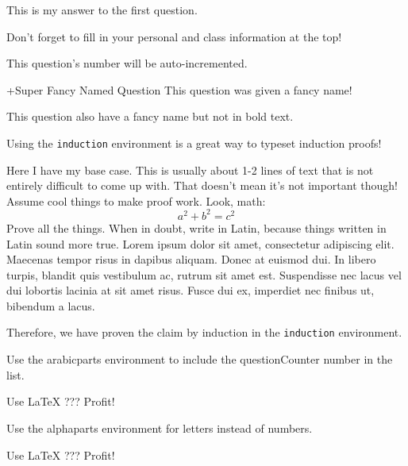 \documentclass[11pt]{homework}
\begin{document}
\maketitle

\question
This is my answer to the first question.

Don't forget to fill in your personal and class information at the top!

\question
This question's number will be auto-incremented.

\lipsum[2]

\question+{Super Fancy Named Question}
This question was given a fancy name!

This question also have a fancy name but not in bold text.

\lipsum[3]

\newpage
\question
Using the \texttt{induction} environment is a great way to typeset induction proofs!
\begin{induction}
  \basecase
  Here I have my base case.
  This is usually about 1-2 lines of text that is not entirely difficult to come up with.
  That doesn't mean it's not important though!
  \indhyp
  Assume cool things to make proof work. Look, math:
  \[a^2 + b^2 = c^2\]
  \indstep
  Prove all the things.  When in doubt, write in Latin, because things
  written in Latin sound more true.  Lorem ipsum dolor sit amet, consectetur
  adipiscing elit. Maecenas tempor risus in dapibus aliquam. Donec at
  euismod dui. In libero turpis, blandit quis vestibulum ac, rutrum sit amet
  est. Suspendisse nec lacus vel dui lobortis lacinia at sit amet risus.
  Fusce dui ex, imperdiet nec finibus ut, bibendum a lacus.
\end{induction}

Therefore, we have proven the claim by induction in the \texttt{induction} environment.

\question
Use the arabicparts environment to include the questionCounter number in the list.
\begin{arabicparts}
  \questionpart Use \LaTeX
  \questionpart ???
  \questionpart Profit!
\end{arabicparts}

\lipsum[7]

\question
Use the alphaparts environment for letters instead of numbers.
\begin{alphaparts}
  \questionpart
  Use \LaTeX
  \questionpart ???
  \questionpart Profit!
\end{alphaparts}
\end{document}
